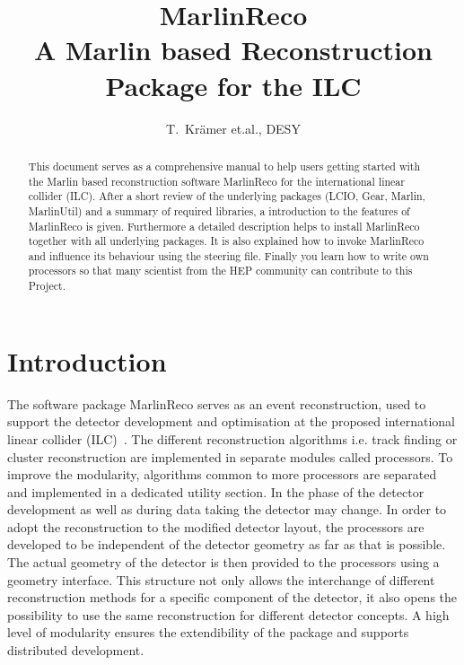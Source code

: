 \title{\huge{\bf MarlinReco}\\
             A Marlin based Reconstruction Package for the ILC}
\author{T.~Kr\"amer et.al., DESY}
\maketitle

\begin{abstract}
This document serves as a comprehensive manual to help 
users getting started with the Marlin based reconstruction software MarlinReco
for the international linear collider (ILC). 
After a short review of the underlying packages 
(LCIO, Gear, Marlin, MarlinUtil) and a summary of required libraries,
a introduction to the features of MarlinReco is given. 
Furthermore a detailed description helps to install MarlinReco  
together with all underlying packages. It is also explained how
to invoke MarlinReco and influence its behaviour using the steering file.
Finally you learn how to write own processors so that many 
scientist from the HEP community can contribute to this Project.  
\end{abstract}
\newpage
\tableofcontents
\newpage

\section{Introduction}

The software package MarlinReco serves as an event reconstruction, 
used to support the detector development and optimisation at  
the proposed international linear collider (ILC)~\cite{ref_ilchome}. 
The different reconstruction 
algorithms i.e. 
track finding or cluster reconstruction are implemented in separate modules 
called processors. To improve the modularity, algorithms 
common to more processors are separated and implemented in a dedicated 
utility section. In the phase of the detector development as well as
during data taking the detector may change. In order to adopt 
the reconstruction to the modified detector layout, the processors are 
developed to be independent of the detector geometry as far as that is 
possible. The actual geometry of the detector is then provided to the 
processors using a geometry interface. 
This structure not only allows the interchange of different
reconstruction methods for a specific component of the detector, it also opens
the possibility to use the same reconstruction for different 
detector concepts. A high level of modularity ensures the
extendibility of the package and supports distributed development.


